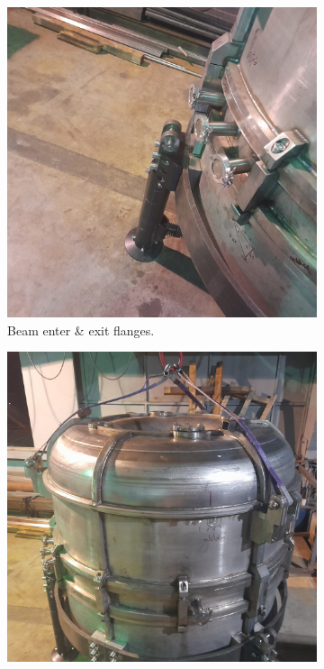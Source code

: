 \documentclass[a4paper,oneside,12pt]{report}
\numberwithin{equation}{chapter}
\begin{document}
{\iffalse \begin{figure}
    \centering
    \begin{subfigure}{.5\textwidth}
      \centering
      \includegraphics[width=.96\linewidth]{./figures/manif/assembled/rhodo_final_cropped_5.jpeg}
      \caption{Beam enter \& exit flanges.}
    \end{subfigure}%
    \centering
    \begin{subfigure}{.5\textwidth}
      \centering
      \includegraphics[width=.96\linewidth]{./figures/manif/assembled/rhodo_final_4_cropped.jpeg}

\end{subfigure}
\end{figure}}
\end{document}
